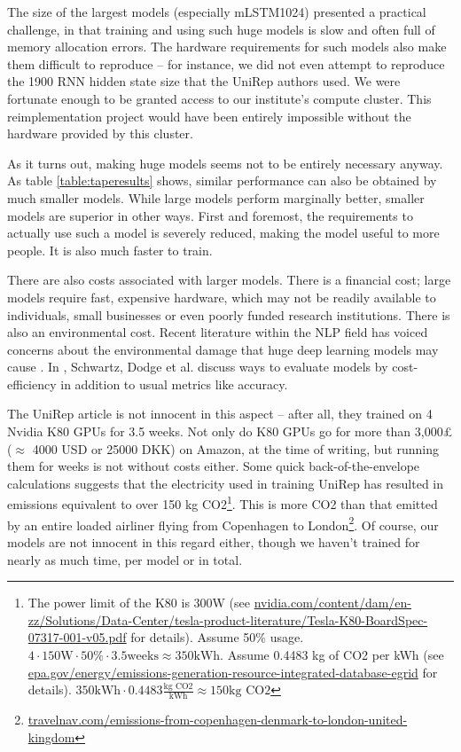 \documentclass[a4paper,12pt]{article}
\begin{document}
The size of the largest models (especially mLSTM1024) presented a practical challenge, in that training and using such huge models is slow and often full of memory allocation errors. The hardware requirements for such models also make them difficult to reproduce -- for instance, we did not even attempt to reproduce the 1900 RNN hidden state size that the UniRep authors used. We were fortunate enough to be granted access to our institute's compute cluster. This reimplementation project would have been entirely impossible without the hardware provided by this cluster.

As it turns out, making huge models seems not to be entirely necessary anyway. As table \ref{table:taperesults} shows, similar performance can also be obtained by much smaller models. While large models perform marginally better, smaller models are superior in other ways. First and foremost, the requirements to actually use such a model is severely reduced, making the model useful to more people. It is also much faster to train.

There are also costs associated with larger models. There is a financial cost; large models require fast, expensive hardware, which may not be readily available to individuals, small businesses or even poorly funded research institutions. There is also an environmental cost. Recent literature within the NLP field has voiced concerns about the environmental damage that huge deep learning models may cause \cite{strubell2019energy}. In \cite{greenai}, Schwartz, Dodge et al. discuss ways to evaluate models by cost-efficiency in addition to usual metrics like accuracy.

The UniRep article is not innocent in this aspect -- after all, they trained on 4 Nvidia K80 GPUs for 3.5 weeks. Not only do K80 GPUs go for more than 3,000£ ($\approx$ 4000 USD or 25000 DKK) on Amazon, at the time of writing, but running them for weeks is not without costs either. Some quick back-of-the-envelope calculations suggests that the electricity used in training UniRep has resulted in emissions equivalent to over 150 kg CO2\footnote{The power limit of the K80 is 300W (see \url{nvidia.com/content/dam/en-zz/Solutions/Data-Center/tesla-product-literature/Tesla-K80-BoardSpec-07317-001-v05.pdf} for details). Assume 50\% usage. $4 \cdot 150\text{W} \cdot 50\% \cdot 3.5\text{weeks} \approx 350\text{kWh}$. Assume 0.4483 kg of CO2 per kWh (see \url{epa.gov/energy/emissions-generation-resource-integrated-database-egrid} for details). $350\text{kWh} \cdot 0.4483 \frac{\text{kg CO2}}{\text{kWh}} \approx 150 \text{kg CO2}$}. This is more CO2 than that emitted by an entire loaded airliner flying from Copenhagen to London\footnote{\url{travelnav.com/emissions-from-copenhagen-denmark-to-london-united-kingdom}}. Of course, our models are not innocent in this regard either, though we haven't trained for nearly as much time, per model or in total.
\end{document}
